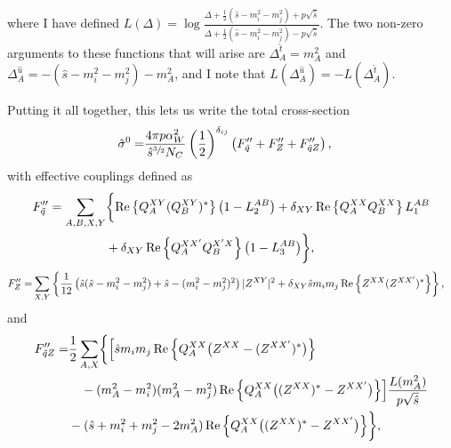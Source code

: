 \documentclass[../main.tex]{subfiles}
\begin{document}
where I have defined \(L(\Delta) = \log\frac{\Delta + \frac{1}{2}(\hat{s}-m_i^2-m_j^2) + p\sqrt{\hat{s}}}{\Delta + \frac{1}{2}(\hat{s}-m_i^2-m_j^2) - p\sqrt{\hat{s}}}\).
The two non-zero arguments to these functions that will arise are \(\Delta^{\hat{t}}_A = m_A^2\) and \(\Delta^{\hat{u}}_A = -(\hat{s}-m_i^2-m_j^2) - m_A^2\), and I note that \(L(\Delta^{\hat{u}}_A) = -L(\Delta^{\hat{t}}_A)\).

Putting it all together, this lets us write the total cross-section
\begin{align}
  \label{part:eq:born}
  \hat\sigma^0 = & \frac{4 \pi p \alpha_W^2}{\hat{s}^{\sfrac{3}{2}} N_C} \pclosed{\frac{1}{2}}^{\delta_{ij}} \pclosed{F^{\prime\prime}_{\tilde{q}} + F^{\prime\prime}_Z + F^{\prime\prime}_{\tilde{q}Z}},
\end{align}
with effective couplings defined as
\\
\begin{align}
  \label{part:eq:eff_coupling_Fq}
  \nonumber
  F^{\prime\prime}_{\tilde{q}} = \sum_{A,B,X,Y} & \biggl\{\Re{Q_A^{XY} (Q_B^{XY})^\ast} \pclosed{1 - L_2^{AB}} + \delta_{XY}\Re{Q_A^{XX} Q_B^{XX}} L_1^{AB} \\
                                                & + \delta_{XY} \Re{Q_A^{XX^\prime} Q_B^{X^\prime X}} \pclosed{1 - L_3^{AB}} \biggr\},
\end{align}
\begin{align}
  \label{part:eq:eff_coupling_FZ}
  F^{\prime\prime}_{Z} = & \sum_{X,Y} \cclosed{\frac{1}{12} \pclosed{\hat{s}(\hat{s}-m_i^2-m_j^2) + \hat{s} - (m_i^2-m_j^2)^2} |Z^{XY}|^2 + \delta_{XY} \hat{s}m_i m_j \Re{Z^{XX} (Z^{XX^\prime})^\ast}},
\end{align}
and
\begin{align}
  \label{part:eq:eff_coupling_FqZ}
  \nonumber
  F^{\prime\prime}_{\tilde{q}Z} = & \frac{1}{2} \sum_{A, X} \biggl\{
  \Bigl[\hat{s} m_i m_j \Re{Q_A^{XX} \bigl(Z^{XX} - (Z^{XX^\prime})^\ast\bigr)}                                                                                       \\
  \nonumber
                                  & \quad - (m_A^2-m_i^2)(m_A^2-m_j^2) \Re{Q_A^{XX}\bigl((Z^{XX})^\ast - Z^{XX^\prime}\bigr)}\Bigr] \frac{L(m_A^2)}{p \sqrt{\hat{s}}} \\
                                  & - (\hat{s} + m_i^2 + m_j^2 - 2m_A^2) \Re{Q_A^{XX}\bigl((Z^{XX})^\ast - Z^{XX^\prime}\bigr)}
  \biggr\},
\end{align}
\end{document}
